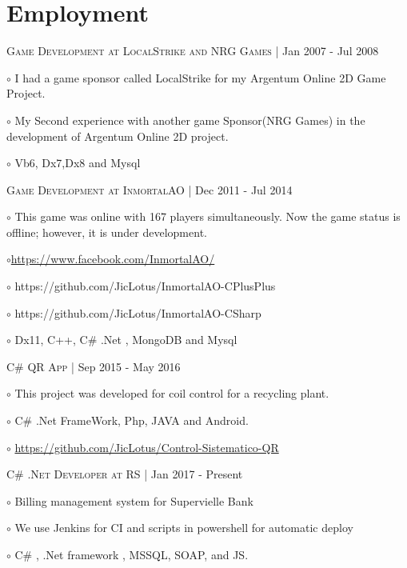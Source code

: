 \documentclass[letterpaper]{article}
\renewenvironment{itemize}{
  \begin{list}{}{
    \setlength{\leftmargin}{1.5em}
  }
}{
  \end{list}
}
\newenvironment{no-indent-itemize}{
  \begin{list}{}{
    \setlength{\leftmargin}{0em}
  }
}{
  \end{list}
}
\def\bullet{$\circ$\xspace}
\begin{document}
\section*{Employment}
\begin{no-indent-itemize}


    \item \textsc{Game Development at LocalStrike and NRG Games} | Jan 2007 - Jul 2008
    \begin{itemize} \item\bullet
    I had a game sponsor called LocalStrike for my Argentum Online 2D Game Project.
    \item\bullet My Second experience with another game Sponsor(NRG Games) in the development of Argentum Online 2D project. 
    \item\bullet Vb6, Dx7,Dx8 and Mysql
    \end{itemize}
    
    
    \item\textsc{Game Development at InmortalAO} | Dec 2011 - Jul 2014
    \begin{itemize} 
    \item\bullet
    This game was online with 167 players simultaneously. Now the game status is offline; however, it is under development.
    \item\bullet \href{https://www.facebook.com/InmortalAO/}{https://www.facebook.com/InmortalAO/} 
    \item\bullet https://github.com/JicLotus/InmortalAO-CPlusPlus
    \item\bullet https://github.com/JicLotus/InmortalAO-CSharp
    \item\bullet Dx11, C++, C\# .Net , MongoDB and Mysql
    \end{itemize}


    \item \textsc{C\# QR App} | Sep 2015 - May 2016
    \begin{itemize} 
    \item\bullet  This project was developed for coil control for a recycling plant. 
    \item\bullet C\# .Net FrameWork, Php, JAVA and Android. 
    
    \item\bullet
    \href{https://github.com/JicLotus/Control-Sistematico-QR}{https://github.com/JicLotus/Control-Sistematico-QR}
    
    \end{itemize}


    \item\textsc{C\# .Net Developer at RS} | Jan 2017 - Present
    \begin{itemize}
    \item\bullet Billing management system for Supervielle Bank
    \item\bullet We use Jenkins for CI and scripts in powershell for automatic deploy
    \item\bullet  C\# , .Net framework , MSSQL, SOAP, and JS.
    \end{itemize}
    


\end{no-indent-itemize}
\end{document}
